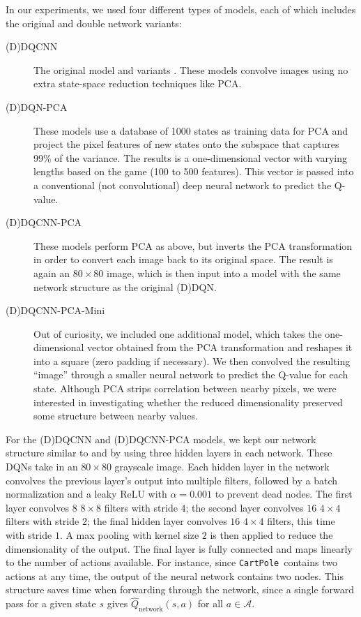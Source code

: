 \documentclass[11pt]{article}
\newcommand{\cp}{\texttt{CartPole}}
\begin{document}
In our experiments, we used four different types of models, each of which includes the original and double network variants: 

\begin{description}
    \item[(D)DQCNN] The original model \cite{mnih2013playing, mnih2015human} and variants \cite{van2016deep}. These models convolve images using no extra state-space reduction techniques like PCA.
    
    \item[(D)DQN-PCA] These models use a database of 1000 states as training data for PCA and project the pixel features of new states onto the subspace that captures 99\% of the variance. The results is a one-dimensional vector with varying lengths based on the game (100 to 500 features). This vector is passed into a conventional (not convolutional) deep neural network to predict the Q-value.
    
    \item[(D)DQCNN-PCA] These models perform PCA as above, but inverts the PCA transformation in order to convert each image back to its original space. The result is again an $80 \times 80$ image, which is then input into a model with the same network structure as the original (D)DQN.
    
    \item[(D)DQCNN-PCA-Mini] Out of curiosity, we included one additional model, which takes the one-dimensional vector obtained from the PCA transformation and reshapes it into a square (zero padding if necessary). We then convolved the resulting ``image'' through a smaller neural network to predict the Q-value for each state. Although PCA strips correlation between nearby pixels, we were interested in investigating whether the reduced dimensionality preserved some structure between nearby values.
\end{description}

For the (D)DQCNN and (D)DQCNN-PCA models, we kept our network structure similar to \cite{mnih2013playing} and \cite{mnih2015human} by using three hidden layers in each network. These DQNs take in an $80 \times 80$ grayscale image. Each hidden layer in the network convolves the previous layer's output into multiple filters, followed by a batch normalization and a leaky ReLU with $\alpha = 0.001$ to prevent dead nodes. The first layer convolves $8$ $8 \times 8$ filters with stride $4$; the second layer convolves $16$ $4 \times 4$ filters with stride $2$; the final hidden layer convolves $16$ $4 \times 4$ filters, this time with stride $1$. A max pooling with kernel size $2$ is then applied to reduce the dimensionality of the output. The final layer is fully connected and maps linearly to the number of actions available. For instance, since \cp~contains two actions at any time, the output of the neural network contains two nodes. This structure saves time when forwarding through the network, since a single forward pass for a given state $s$ gives $\hat{Q}_\text{network}(s, a)$ for all $a \in \mathcal{A}$.
\end{document}
